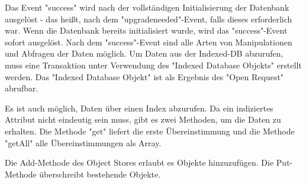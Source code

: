 
Das Event "success" wird nach der vollständigen Initialisierung der Datenbank ausgelöst - 
das heißt, nach dem "upgradeneeded"-Event, falls dieses erforderlich war. 
Wenn die Datenbank bereits initialisiert wurde, wird das "success"-Event sofort ausgelöst. 
Nach dem "success"-Event sind alle Arten von Manipulationen und Abfragen der Daten möglich. 
Um Daten aus der Indexed-DB abzurufen, muss eine Transaktion unter Verwendung des "Indexed Database Objekts" erstellt werden. 
Das "Indexed Database Objekt" ist als Ergebnis des "Open Request" abrufbar.


Es ist auch möglich, Daten über einen Index abzurufen. Da ein indiziertes 
Attribut nicht eindeutig sein muss, gibt es zwei Methoden, um die Daten zu erhalten. Die Methode "get" liefert die erste Übereinstimmung und die Methode "getAll" alle Über\-ein\-stimmungen als Array.


Die Add-Methode des Object Stores erlaubt es Objekte hinzuzufügen. Die Put-Methode überschreibt bestehende Objekte.
\cite{MDNIndexedDB}
\cite{MDNUsingIndexedDB}